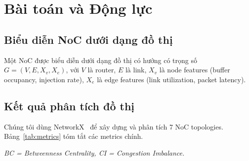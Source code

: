 \documentclass[conference]{IEEEtran}
\begin{document}
\section{Bài toán và Động lực}
\label{sec:problem}

\subsection{Biểu diễn NoC dưới dạng đồ thị}

Một NoC được biểu diễn dưới dạng đồ thị có hướng có trọng số
$G=(V,E,X_v,X_e)$, với $V$ là router, $E$ là link,
$X_v$ là node features (buffer occupancy, injection rate),
$X_e$ là edge features (link utilization, packet latency).

\subsection{Kết quả phân tích đồ thị}

Chúng tôi dùng NetworkX~\cite{networkx2008} để xây dựng và phân tích
7 NoC topologies. Bảng~\ref{tab:metrics} tóm tắt các metrics chính.

\begin{table}[h]
\centering
\caption{So sánh graph metrics giữa các NoC topologies}
\label{tab:metrics}
\vspace{2mm}
\small\textit{BC = Betweenness Centrality, CI = Congestion Imbalance.}
\end{table}
\end{document}
